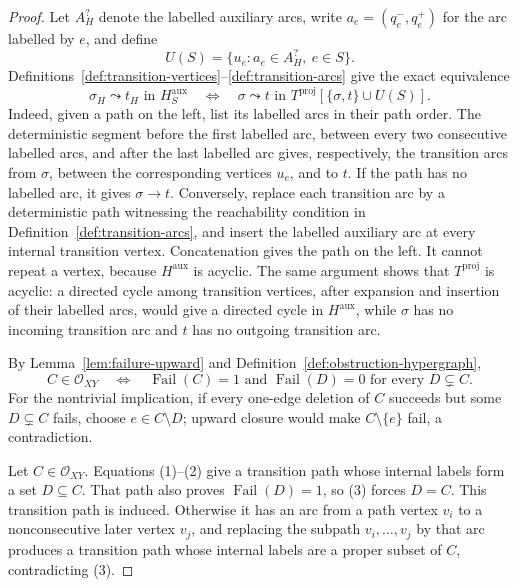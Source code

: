 \documentclass{article}
\begin{document}
\begin{proof}
Let \(A_H^{?}\) denote the labelled auxiliary arcs, write \(a_e=(q_e^-,q_e^+)\) for the arc labelled by \(e\), and define
\[
 U(S)=\{u_e:a_e\in A_H^{?},\ e\in S\}.
\]
Definitions~\ref{def:transition-vertices}--\ref{def:transition-arcs} give the exact equivalence
\[
 \sigma_H\leadsto t_H\text{ in }H^{\mathrm{aux}}_S
 \quad\Longleftrightarrow\quad
 \sigma\leadsto t\text{ in }
 T^{\mathrm{proj}}[\{\sigma,t\}\cup U(S)].
\tag{2}
\]
Indeed, given a path on the left, list its labelled arcs in their path order.  The deterministic segment before the first labelled arc, between every two consecutive labelled arcs, and after the last labelled arc gives, respectively, the transition arcs from \(\sigma\), between the corresponding vertices \(u_e\), and to \(t\).  If the path has no labelled arc, it gives \(\sigma\to t\).  Conversely, replace each transition arc by a deterministic path witnessing the reachability condition in Definition~\ref{def:transition-arcs}, and insert the labelled auxiliary arc at every internal transition vertex.  Concatenation gives the path on the left.  It cannot repeat a vertex, because \(H^{\mathrm{aux}}\) is acyclic.  The same argument shows that \(T^{\mathrm{proj}}\) is acyclic: a directed cycle among transition vertices, after expansion and insertion of their labelled arcs, would give a directed cycle in \(H^{\mathrm{aux}}\), while \(\sigma\) has no incoming transition arc and \(t\) has no outgoing transition arc.

By Lemma~\ref{lem:failure-upward} and Definition~\ref{def:obstruction-hypergraph},
\[
 C\in\mathcal O_{XY}
 \quad\Longleftrightarrow\quad
 \operatorname{Fail}(C)=1
 \text{ and }\operatorname{Fail}(D)=0
 \text{ for every }D\subsetneq C.
\tag{3}
\]
For the nontrivial implication, if every one-edge deletion of \(C\) succeeds but some \(D\subsetneq C\) fails, choose \(e\in C\setminus D\); upward closure would make \(C\setminus\{e\}\) fail, a contradiction.

Let \(C\in\mathcal O_{XY}\).  Equations (1)--(2) give a transition path whose internal labels form a set \(D\subseteq C\).  That path also proves \(\operatorname{Fail}(D)=1\), so (3) forces \(D=C\).  This transition path is induced.  Otherwise it has an arc from a path vertex \(v_i\) to a nonconsecutive later vertex \(v_j\), and replacing the subpath \(v_i,\ldots,v_j\) by that arc produces a transition path whose internal labels are a proper subset of \(C\), contradicting (3).


\end{proof}
\end{document}
